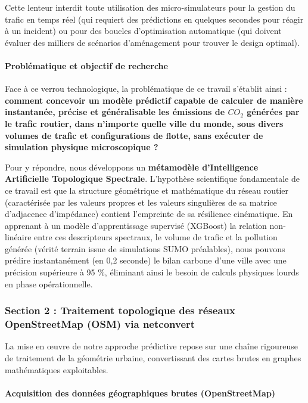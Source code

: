 \documentclass[10pt, a4paper]{article}
\begin{document}
Cette lenteur interdit toute utilisation des micro-simulateurs pour la
gestion du trafic en temps réel (qui requiert des prédictions en
quelques secondes pour réagir à un incident) ou pour des boucles
d'optimisation automatique (qui doivent évaluer des milliers de
scénarios d'aménagement pour trouver le design optimal).

\paragraph{Problématique et objectif de
recherche}\label{probluxe9matique-et-objectif-de-recherche}

Face à ce verrou technologique, la problématique de ce travail s'établit
ainsi : \textbf{comment concevoir un modèle prédictif capable de
calculer de manière instantanée, précise et généralisable les émissions
de \(CO_2\) générées par le trafic routier, dans n'importe quelle ville
du monde, sous divers volumes de trafic et configurations de flotte,
sans exécuter de simulation physique microscopique ?}

Pour y répondre, nous développons un \textbf{métamodèle d'Intelligence
Artificielle Topologique Spectrale}. L'hypothèse scientifique
fondamentale de ce travail est que la structure géométrique et
mathématique du réseau routier (caractérisée par les valeurs propres et
les valeurs singulières de sa matrice d'adjacence d'impédance) contient
l'empreinte de sa résilience cinématique. En apprenant à un modèle
d'apprentissage supervisé (XGBoost) la relation non-linéaire entre ces
descripteurs spectraux, le volume de trafic et la pollution générée
(vérité terrain issue de simulations SUMO préalables), nous pouvons
prédire instantanément (en 0,2 seconde) le bilan carbone d'une ville
avec une précision supérieure à 95 \%, éliminant ainsi le besoin de
calculs physiques lourds en phase opérationnelle.

\subsubsection{Section 2 : Traitement topologique des réseaux
OpenStreetMap (OSM) via
netconvert}\label{section-2-traitement-topologique-des-ruxe9seaux-openstreetmap-osm-via-netconvert}

La mise en œuvre de notre approche prédictive repose sur une chaîne
rigoureuse de traitement de la géométrie urbaine, convertissant des
cartes brutes en graphes mathématiques exploitables.

\paragraph{Acquisition des données géographiques brutes
(OpenStreetMap)}\label{acquisition-des-donnuxe9es-guxe9ographiques-brutes-openstreetmap}
\end{document}
